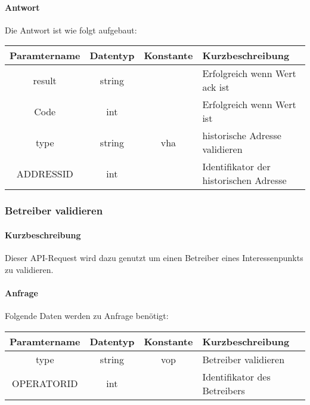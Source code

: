 \paragraph{Antwort}Die Antwort ist wie folgt aufgebaut:
\begin{table}[H]
	\begin{tabular}{|c|c|c|p{6.5cm}|}
		\hline
		\textbf{Paramtername} & \textbf{Datentyp} & \textbf{Konstante} & \textbf{Kurzbeschreibung}                                                                                               \\ \hline
		result              & string           &                 & Erfolgreich wenn Wert {\glqq ack\grqq} ist \\ \hline
		Code                & int              &                 & Erfolgreich wenn Wert {\glqq 0\grqq} ist \\ \hline
		type                & string           & vha             & historische Adresse validieren \\ \hline
		ADDRESSID           & int              &                 & Identifikator der historischen Adresse \\ \hline
	\end{tabular}
\end{table}
\subsubsection{Betreiber validieren}
\paragraph{Kurzbeschreibung}Dieser API-Request wird dazu genutzt um einen Betreiber eines Interessenpunkts zu validieren.
\paragraph{Anfrage}Folgende Daten werden zu Anfrage benötigt:
\begin{table}[H]
	\begin{tabular}{|c|c|c|p{6.5cm}|}
		\hline
		\textbf{Paramtername} & \textbf{Datentyp} & \textbf{Konstante} & \textbf{Kurzbeschreibung}                                                                                               \\ \hline
		type                & string            & vop                & Betreiber validieren \\ \hline
		OPERATORID          & int               &                    & Identifikator des Betreibers \\ \hline
	\end{tabular}
\end{table}
